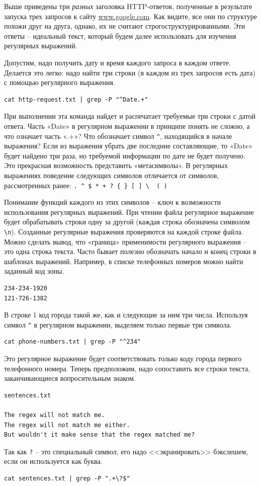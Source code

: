 \documentclass[12pt]{article}
\begin{document}
Выше приведены три \emph{разных} заголовка HTTP-ответов, полученные в
результате запуска трех запросов к сайту
\href{http://www.google.com}{www.google.com}. Как видите, все они по
структуре похожи друг на друга, однако, их не считают
строгоструктурированными. Эти ответы -- идеальный текст, который будем
далее использовать для изучения регулярных выражений.

Допустим, надо
получить дату и время каждого запроса в каждом ответе. Делается это
легко: надо найти три строки (в каждом из трех запросов есть дата) с
помощью регулярного выражения.
\begin{verbatim}
cat http-request.txt | grep -P "^Date.+"
\end{verbatim}

При выполнении эта команда найдет и распечатает требуемые три строки с
датой ответа. Часть «Date» в регулярном выражении в принципе понять
не сложно, а что означает часть «.+»? Что обозначает символ
\texttt{\^{}}, находящийся в начале выражения? Если из выражения убрать
две последние составляющие, то «Date» будет найдено три раза, но
требуемой информации по дате не будет получено. Это прекрасная
возможность представить «метасимволы». В регулярных выражениях поведение
следующих символов отличается от символов, рассмотренных ранее:
\texttt{.\ \^{}\ \$\ *\ +\ ?\ \{\ \}\ {[}\ {]}\ \textbackslash{}\ \textbar{}\ (\ )}

Понимание функций каждого из этих символов -- ключ к возможности
использования регулярных выражений. При чтении файла регулярное
выражение будет обрабатывать строки одну за другой (каждая строка
обозначена символом \texttt{\textbackslash{}n}). Созданные регулярные
выражения проверяются на каждой строке файла. Можно сделать вывод, что
«граница» применимости регулярного выражения -- это одна строка текста.
Часто бывает полезно обозначать начало и конец строки в шаблонах
выражений. Например, в списке телефонных номеров можно найти заданный
код зоны.
\begin{verbatim}
234-234-1920
121-726-1382
\end{verbatim}
В строке 1 код города такой же, как и следующие за ним три числа.
Используя символ \texttt{\^{}} в регулярном выражении, выделяем только
первые три символа.
\begin{verbatim}
cat phone-numbers.txt | grep -P "^234"
\end{verbatim}
Это регулярное выражение будет соответствовать только коду города
первого телефонного номера. Теперь предположим, надо сопоставить все
строки текста, заканчивающиеся вопросительным знаком.
\begin{verbatim}
sentences.txt

The regex will not match me.
The regex will not match me either.
But wouldn't it make sense that the regex matched me?
\end{verbatim}
Так как \texttt{?} -- это специальный символ, его надо <<экранировать>>
бэкслешем, если он используется как буква.
\begin{verbatim}
cat sentences.txt | grep -P ".+\?$"
\end{verbatim}
\end{document}
